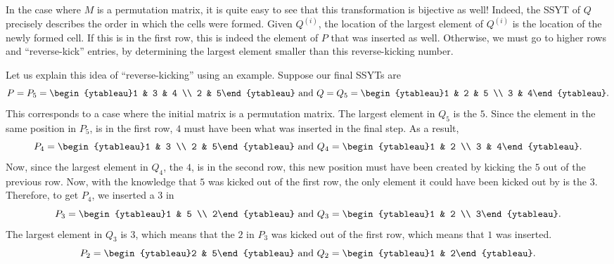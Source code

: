 	In the case where $M$ is a permutation matrix, it is quite easy to see that this transformation is bijective as well! Indeed, the SSYT of $Q$ precisely describes the order in which the cells were formed. Given $Q^{(i)}$, the location of the largest element of $Q^{(i)}$ is the location of the newly formed cell. If this is in the first row, this is indeed the element of $P$ that was inserted as well. Otherwise, we must go to higher rows and ``reverse-kick'' entries, by determining the largest element smaller than this reverse-kicking number.
	\begin{fex}
		Let us explain this idea of ``reverse-kicking'' using an example. Suppose our final SSYTs are
		\[ P = P_5 = \begin{ytableau}1 & 3 & 4 \\ 2 & 5\end{ytableau} \text{ and } Q = Q_5 = \begin{ytableau}1 & 2 & 5 \\ 3 & 4\end{ytableau}. \]
		This corresponds to a case where the initial matrix is a permutation matrix. The largest element in $Q_5$ is the $5$. Since the element in the same position in $P_5$, is in the first row, $4$ must have been what was inserted in the final step. As a result,
		\[ P_4 = \begin{ytableau}1 & 3 \\ 2 & 5\end{ytableau} \text{ and } Q_4 = \begin{ytableau}1 & 2 \\ 3 & 4\end{ytableau}. \]
		Now, since the largest element in $Q_4$, the $4$, is in the second row, this new position must have been created by kicking the $5$ out of the previous row. Now, with the knowledge that $5$ was kicked out of the first row, the only element it could have been kicked out by is the $3$. Therefore, to get $P_4$, we inserted a $3$ in
		\[ P_3 = \begin{ytableau}1 & 5 \\ 2\end{ytableau} \text{ and } Q_3 = \begin{ytableau}1 & 2 \\ 3\end{ytableau}. \]
		The largest element in $Q_3$ is $3$, which means that the $2$ in $P_3$ was kicked out of the first row, which means that $1$ was inserted.
		\[ P_2 = \begin{ytableau}2 & 5\end{ytableau} \text{ and } Q_2 = \begin{ytableau}1 & 2\end{ytableau}. \]

\end{fex}
